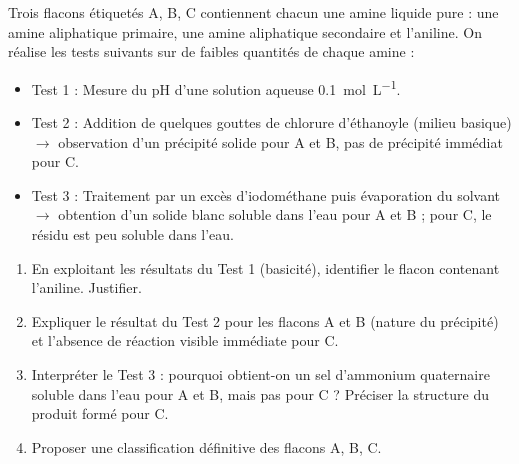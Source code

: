 \documentclass[11pt]{article}
\begin{document}
\begin{exercice}
Trois flacons étiquetés A, B, C contiennent chacun une amine liquide pure : une amine aliphatique primaire, une amine aliphatique secondaire et l'aniline. On réalise les tests suivants sur de faibles quantités de chaque amine :
\begin{itemize}
    \item Test 1 : Mesure du pH d'une solution aqueuse \SI{0,1}{mol.L^{-1}}.
    \item Test 2 : Addition de quelques gouttes de chlorure d'éthanoyle (milieu basique) $\rightarrow$ observation d'un précipité solide pour A et B, pas de précipité immédiat pour C.
    \item Test 3 : Traitement par un excès d'iodométhane puis évaporation du solvant $\rightarrow$ obtention d'un solide blanc soluble dans l'eau pour A et B ; pour C, le résidu est peu soluble dans l'eau.
\end{itemize}
\begin{enumerate}
    \item En exploitant les résultats du Test 1 (basicité), identifier le flacon contenant l'aniline. Justifier.
    \item Expliquer le résultat du Test 2 pour les flacons A et B (nature du précipité) et l'absence de réaction visible immédiate pour C.
    \item Interpréter le Test 3 : pourquoi obtient-on un sel d'ammonium quaternaire soluble dans l'eau pour A et B, mais pas pour C ? Préciser la structure du produit formé pour C.
    \item Proposer une classification définitive des flacons A, B, C.
\end{enumerate}
\end{exercice}
\end{document}

